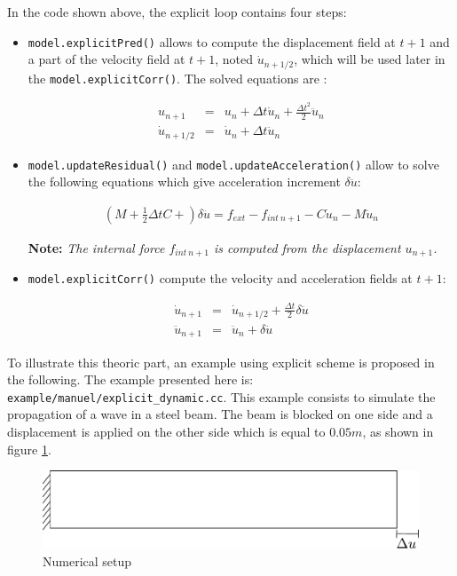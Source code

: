 \documentclass[a4paper,11pt]{book}
\newcommand{\code}[1]{{\tt{#1}}}
\newcommand{\note}[1]{\textbf{Note: }\textit{#1}}
\begin{document}
In the code shown above, the explicit loop contains four steps:
\begin{itemize}
\item \code{model.explicitPred()} allows to compute the displacement field at $t+1$ and a 
part of the velocity field at $t+1$, noted $\dot{u}_{n+1/2}$, which will be used later in 
the \code{model.explicitCorr()}. The solved equations are :

\begin{eqnarray}
  u_{n+1}        &=& u_{n} +  \Delta t \dot{u}_{n} + \frac{\Delta t^2}{2} \ddot{u}_{n} \\
  \dot{u}_{n+1/2}  &=& \dot{u}_{n} +  \Delta t  \ddot{u}_{n}
  \label{eqn:smm:explicit:onehalfvelocity}
\end{eqnarray}

\item \code{model.updateResidual()} and \code{model.updateAcceleration()} allow to 
solve the following equations which give acceleration increment $\delta \ddot{u}$:

\begin{eqnarray}
 (M + \frac{1}{2} \Delta t C + ) \delta \ddot{u} = f_{ext} - f_{int~n+1} - C \dot{u}_{n} - M \ddot{u}_{n}
\end{eqnarray}

\note{The internal force $f_{int~n+1}$ is computed from the displacement $u_{n+1}$.} 

\item \code{model.explicitCorr()} compute the velocity and acceleration fields at $t+1$:

\begin{eqnarray}
\dot{u}_{n+1}  &=& \dot{u}_{n+1/2} + \frac{\Delta t}{2} \delta \ddot{u} \\
\ddot{u}_{n+1}  &=& \ddot{u}_{n} +  \delta \ddot{u}
\end{eqnarray}

\end{itemize}


To illustrate this theoric part, an example using explicit scheme is proposed in the 
following.
The example presented here is: \code{example/manuel/explicit\_dynamic.cc}.
This example consists to simulate the propagation of a wave in a steel beam. The beam 
is blocked on one side and a displacement is applied on the other side which is equal 
to $0.05m$, as shown in figure \ref{fig:smm:explicit}. 

\begin{figure}[!htb]
  \centering
  \includegraphics[scale=.6]{figures/explicit_dynamic}
  \caption{Numerical setup \label{fig:smm:explicit}}
\end{figure}
\end{document}
